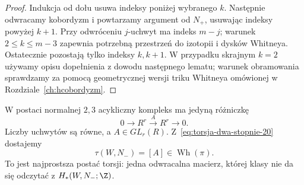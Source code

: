 \begin{proof}
Indukcja od dołu usuwa indeksy poniżej wybranego
$k$. Następnie odwracamy kobordyzm i powtarzamy
argument od $N_+$, usuwając indeksy powyżej
$k+1$. Przy odwróceniu $j$-uchwyt ma indeks
$m-j$; warunek $2\leq k\leq m-3$ zapewnia
potrzebną przestrzeń do izotopii i dysków
Whitneya. Ostatecznie pozostają tylko
indeksy $k,k+1$. W przypadku skrajnym $k=2$
używamy opisu dopełnienia z dowodu
następnego lematu; warunek obramowania
sprawdzamy za pomocą geometrycznej wersji
triku Whitneya omówionej w
Rozdziale~\ref{ch:hcobordyzm}.
\end{proof}

W postaci normalnej $2,3$ acykliczny kompleks ma
jedyną różniczkę
\[
 0\longrightarrow R^r\xrightarrow{\ A\ }R^r
 \longrightarrow0.
\]
Liczby uchwytów są równe, a $A\in GL_r(R)$.
Z~\eqref{eq:torsja-dwa-stopnie-20} dostajemy
\begin{equation}\label{eq:torsja-macierz-20}
             \tau(W,N_-)=[A]\in\operatorname{Wh}(\pi).
\end{equation}
To jest najprostsza postać torsji: jedna odwracalna
macierz, której klasy nie da się odczytać z
$H_*(W,N_-;\Z)$.

